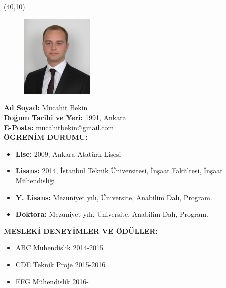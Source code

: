 \vspace{10mm}

\noindent \newsavebox{\mysquare}
\savebox{\mysquare}{\textcolor{black}{\rule[2.3pt]{3.4pt}{3.4pt}}}

\setlength{\TPHorizModule}{10pt}
\setlength{\TPVertModule}{10pt}

\begin{textblock}{1}(40,10)
 	\begin{figure}[p]
		\includegraphics[width=3.5cm,keepaspectratio=true]{./fig/CV.jpg}
	\end{figure}
\end{textblock}

\noindent \textbf{Ad Soyad:} Mücahit Bekin \\

\vspace{-3mm}
 \textbf{Doğum Tarihi ve Yeri:} 1991, Ankara \\

\vspace{-3mm}
 \textbf{E-Posta:} mucahitbekin@gmail.com \\

\textbf{ÖĞRENİM DURUMU:} \vspace{-3mm}
\begin{itemize}
	\item \textbf{Lise:} 2009, Ankara Atatürk Lisesi 
	\item \textbf{Lisans:} 2014, İstanbul Teknik Üniversitesi, İnşaat Fakültesi,
İnşaat Mühendisliği 
	\item \textbf{Y. Lisans:} Mezuniyet yılı, Üniversite, Anabilim Dalı, Program. 
	\item \textbf{Doktora:} Mezuniyet yılı, Üniversite, Anabilim Dalı, Program. 
\end{itemize}

\textbf{MESLEKİ DENEYİMLER VE ÖDÜLLER:} \vspace{-3mm}
\begin{itemize}
	\item ABC Mühendislik 2014-2015 
	\item CDE Teknik Proje 2015-2016 
	\item EFG Mühendislik 2016- 
\end{itemize}

